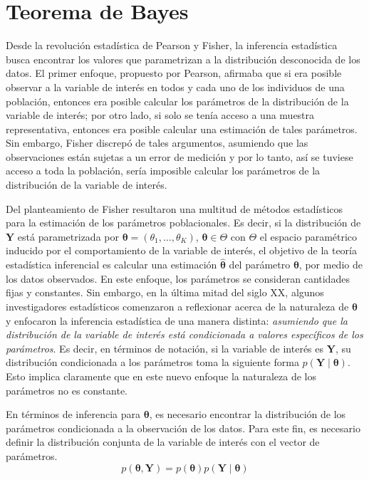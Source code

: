 \documentclass[
  spanish,
]{book}
\theoremstyle{definition}
\theoremstyle{definition}
\theoremstyle{definition}
\theoremstyle{remark}
\begin{document}
\hypertarget{teorema-de-bayes}{%
\section{Teorema de Bayes}\label{teorema-de-bayes}}

Desde la revolución estadística de Pearson y Fisher, la inferencia
estadística busca encontrar los valores que parametrizan a la
distribución desconocida de los datos. El primer enfoque, propuesto por
Pearson, afirmaba que si era posible observar a la variable de interés
en todos y cada uno de los individuos de una población, entonces era
posible calcular los parámetros de la distribución de la variable de
interés; por otro lado, si solo se tenía acceso a una muestra
representativa, entonces era posible calcular una estimación de tales
parámetros. Sin embargo, Fisher discrepó de tales argumentos, asumiendo
que las observaciones están sujetas a un error de medición y por lo
tanto, así se tuviese acceso a toda la población, sería imposible calcular
los parámetros de la distribución de la variable de interés.

Del planteamiento de Fisher resultaron una multitud de métodos
estadísticos para la estimación de los parámetros poblacionales. Es
decir, si la distribución de \(\mathbf{Y}\) está parametrizada por
\(\boldsymbol \theta=(\theta_1,\ldots,\theta_K)\), \(\boldsymbol \theta\in \Theta\) con \(\Theta\)
el espacio paramétrico inducido por el comportamiento de la variable de
interés, el objetivo de la teoría estadística inferencial es calcular
una estimación \(\hat{\boldsymbol \theta}\) del parámetro \(\boldsymbol \theta\), por medio de los
datos observados. En este enfoque, los parámetros se consideran
cantidades fijas y constantes. Sin embargo, en la última mitad del siglo
XX, algunos investigadores estadísticos comenzaron a reflexionar acerca
de la naturaleza de \(\boldsymbol \theta\) y enfocaron la inferencia estadística de
una manera distinta: \emph{asumiendo que la distribución de la variable de
interés está condicionada a valores específicos de los parámetros}. Es
decir, en términos de notación, si la variable de interés es
\(\mathbf{Y}\), su distribución condicionada a los parámetros toma la
siguiente forma \(p(\mathbf{Y} \mid \boldsymbol \theta)\). Esto implica claramente
que en este nuevo enfoque la naturaleza de los parámetros no es
constante.

En términos de inferencia para \(\boldsymbol \theta\), es necesario encontrar la
distribución de los parámetros condicionada a la observación de los
datos. Para este fin, es necesario definir la distribución conjunta de
la variable de interés con el vector de parámetros.
\begin{equation*}
p(\boldsymbol \theta,\mathbf{Y})=p(\boldsymbol \theta)p(\mathbf{Y} \mid \boldsymbol \theta)
\end{equation*}
\end{document}

